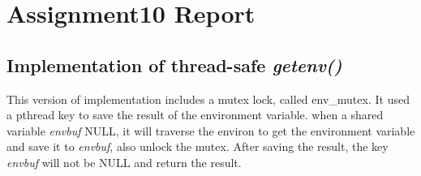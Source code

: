 \chapter{Assignment10 Report}

\section{Implementation of thread-safe \textit{getenv()}}
This version of implementation includes a mutex lock, called env_mutex.
It used a pthread key to save the result of the environment variable.
when a shared variable \textit{envbuf} NULL, it will traverse the environ to get the environment variable and save it to \textit{envbuf}, also unlock the mutex.
After saving the result, the key \textit{envbuf} will not be NULL and return the result.



\newpage